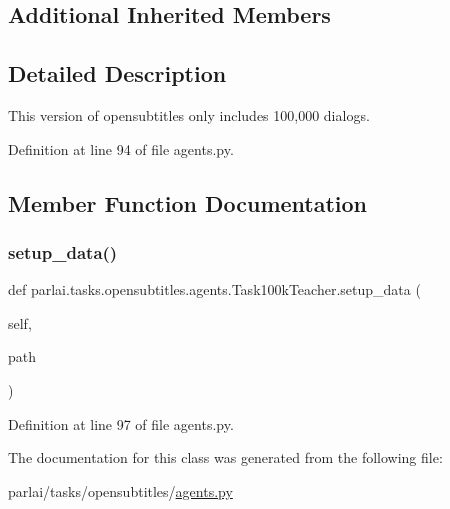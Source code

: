 \subsection*{Additional Inherited Members}


\subsection{Detailed Description}
\begin{DoxyVerb}This version of opensubtitles only includes 100,000 dialogs.\end{DoxyVerb}
 

Definition at line 94 of file agents.\+py.



\subsection{Member Function Documentation}
\mbox{\label{classparlai_1_1tasks_1_1opensubtitles_1_1agents_1_1Task100kTeacher_ac1bceba11d526547b201f29a15427deb}} 
\subsubsection{\texorpdfstring{setup\+\_\+data()}{setup\_data()}}
{\footnotesize\ttfamily def parlai.\+tasks.\+opensubtitles.\+agents.\+Task100k\+Teacher.\+setup\+\_\+data (\begin{DoxyParamCaption}\item[{}]{self,  }\item[{}]{path }\end{DoxyParamCaption})}



Definition at line 97 of file agents.\+py.



The documentation for this class was generated from the following file\+:\begin{DoxyCompactItemize}
\item 
parlai/tasks/opensubtitles/\hyperlink{parlai_2tasks_2opensubtitles_2agents_8py}{agents.\+py}\end{DoxyCompactItemize}
